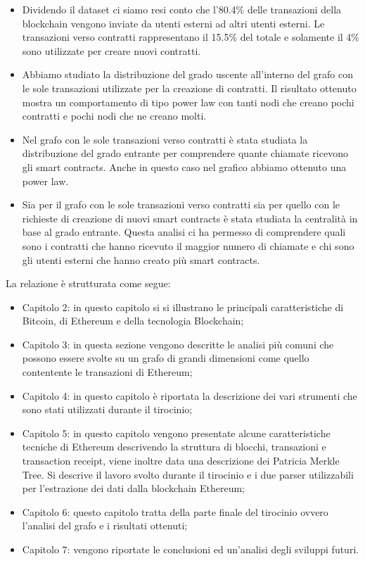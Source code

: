 \documentclass[12pt]{report}
\begin{document}
\begin{itemize}
    \item Dividendo il dataset ci siamo resi conto che l'80.4\% delle transazioni della blockchain vengono inviate da utenti esterni ad altri utenti esterni. Le transazioni verso contratti rappresentano il 15.5\% del totale e solamente il 4\% sono utilizzate per creare nuovi contratti.
    \item Abbiamo studiato la distribuzione del grado uscente all'interno del grafo con le sole transazioni utilizzate per la creazione di contratti. Il risultato ottenuto mostra un comportamento di tipo power law con tanti nodi che creano pochi contratti e pochi nodi che ne creano molti.
    \item Nel grafo con le sole transazioni verso contratti è stata studiata la distribuzione del grado entrante per comprendere quante chiamate ricevono gli smart contracts. 
    Anche in questo caso nel grafico abbiamo ottenuto una power law.
    \item Sia per il grafo con le sole transazioni verso contratti sia per quello con le richieste di creazione di nuovi smart contracts è stata studiata la centralità in base al grado entrante.
    Questa analisi ci ha permesso di comprendere quali sono i contratti che hanno ricevuto il maggior numero di chiamate e chi sono gli utenti esterni che hanno creato più smart contracts.
    
\end{itemize}

La relazione è strutturata come segue:

\begin{itemize}
    \item Capitolo 2: in questo capitolo si si illustrano le principali caratteristiche di Bitcoin, di Ethereum e della tecnologia Blockchain;
    \item Capitolo 3: in questa sezione vengono descritte le analisi più comuni che possono essere svolte su un grafo di grandi dimensioni come quello contentente le transazioni di Ethereum;
    \item Capitolo 4: in questo capitolo è riportata la descrizione dei vari strumenti che sono stati utilizzati durante il tirocinio;
    \item Capitolo 5: in questo capitolo vengono presentate alcune caratteristiche tecniche di Ethereum descrivendo la struttura di blocchi, transazioni e transaction receipt, viene inoltre data una descrizione dei Patricia Merkle Tree.
    \newline Si descrive il lavoro svolto durante il tirocinio e i due parser utilizzabili per l'estrazione dei dati dalla blockchain Ethereum;
    \item Capitolo 6: questo capitolo tratta della parte finale del tirocinio ovvero l'analisi del grafo e i risultati ottenuti;
    \item Capitolo 7: vengono riportate le conclusioni ed un'analisi degli sviluppi futuri.
\end{itemize}
\end{document}

